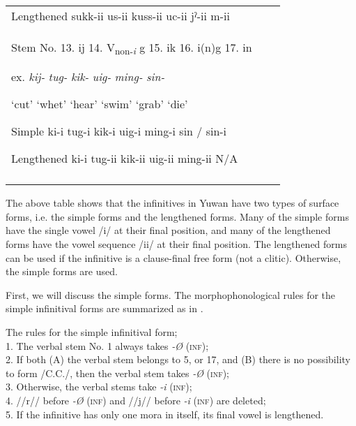 \begin{table}
\begin{tabular}{lll}
Lengthened  sukk-ii  us-ii  kuss-ii  uc-ii  jˀ-ii  m-ii\\

\tablevspace
Stem No.  13. ij  14. V\textsubscript{non-}\textit{\textsubscript{i}} g  15. ik  16. i(n)g    17. in

ex.  \textit{kij-}  \textit{tug-}  \textit{kik-}  \textit{uig-}  \textit{ming-}  \textit{sin-}

  ‘cut’  ‘whet’  ‘hear’  ‘swim’  ‘grab’  ‘die’

Simple  ki-i  tug-i  kik-i  uig-i  ming-i  sin / sin-i

Lengthened  ki-i  tug-ii  kik-ii  uig-ii  ming-ii  N/A\\
\lspbottomrule
\end{tabular}
\end{table}

The above table shows that the infinitives in Yuwan have two types of surface forms, i.e. the simple forms and the lengthened forms. Many of the simple forms have the single vowel /i/ at their final position, and many of the lengthened forms have the vowel sequence /ii/ at their final position. The lengthened forms can be used if the infinitive is a clause-final free form (not a clitic). Otherwise, the simple forms are used.

  First, we will discuss the simple forms. The morphophonological rules for the simple infinitival forms are summarized as in .

\ea\label{ex:8-106}
  The rules for the simple infinitival form;                                                                                                                       \\
  1.  The verbal stem No. 1 always takes \textit{-Ø} (\textsc{inf});                                                                                               \\
  2.  If both (A) the verbal stem belongs to 5, or 17, and (B) there is no possibility to form /C.C./, then the verbal stem takes \textit{-Ø} (\textsc{inf});      \\
  3.  Otherwise, the verbal stems take \textit{-i} (\textsc{inf});                                                                                                 \\
  4.  //r// before \textit{-Ø} (\textsc{inf}) and //j// before \textit{-i} (\textsc{inf}) are deleted;                                                             \\
  5.  If the infinitive has only one mora in itself, its final vowel is lengthened.
\z

